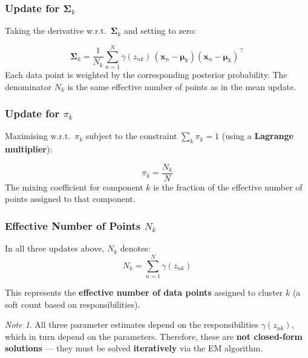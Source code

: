 \documentclass[11pt,a4paper]{article}
\theoremstyle{definition}
\theoremstyle{plain}
\theoremstyle{remark}
\newtheorem*{remark}{Note}
\begin{document}
\subsubsection{Update for $\boldsymbol{\Sigma}_k$}

Taking the derivative w.r.t.\ $\boldsymbol{\Sigma}_k$ and setting to zero:

\begin{tcolorbox}[colback=yellow!10!white,colframe=orange!75!black,title=\textbf{Covariance Update}]
\[
\boldsymbol{\Sigma}_k = \frac{1}{N_k} \sum_{n=1}^{N} \gamma(z_{nk}) \, (\mathbf{x}_n - \boldsymbol{\mu}_k)(\mathbf{x}_n - \boldsymbol{\mu}_k)^\top
\]
Each data point is weighted by the corresponding posterior probability. The denominator $N_k$ is the same effective number of points as in the mean update.
\end{tcolorbox}

\subsubsection{Update for $\pi_k$}

Maximising w.r.t.\ $\pi_k$ subject to the constraint $\sum_k \pi_k = 1$ (using a \textbf{Lagrange multiplier}):

\begin{tcolorbox}[colback=yellow!10!white,colframe=orange!75!black,title=\textbf{Mixing Coefficient Update}]
\[
\pi_k = \frac{N_k}{N}
\]
The mixing coefficient for component $k$ is the fraction of the effective number of points assigned to that component.
\end{tcolorbox}

\subsubsection{Effective Number of Points $N_k$}

In all three updates above, $N_k$ denotes:
\[
N_k = \sum_{n=1}^{N} \gamma(z_{nk})
\]

This represents the \textbf{effective number of data points} assigned to cluster $k$ (a soft count based on responsibilities).

\begin{remark}
All three parameter estimates depend on the responsibilities $\gamma(z_{nk})$, which in turn depend on the parameters. Therefore, these are \textbf{not closed-form solutions} --- they must be solved \textbf{iteratively} via the EM algorithm.
\end{remark}
\end{document}
